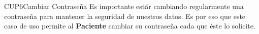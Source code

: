 \begin{UseCase}{CUP6}{Cambiar Contraseña}
    {
    	Es importante estár cambiando regularmente una contraseña para mantener la seguridad de nuestros datos. Es por eso que este caso de uso permite al \textbf{Paciente} cambiar su contraseña cada que éste lo solicite.
    }


\end{UseCase}
